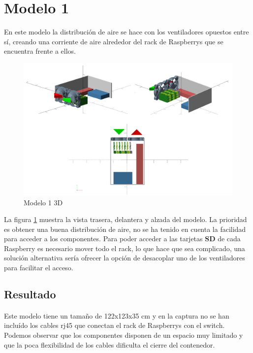 \section{Modelo 1} 
\label{makereference4.3}
\paragraph{}

En este modelo la distribución de aire se hace con los ventiladores opuestos entre sí, creando una corriente de aire alrededor del rack de Raspberrys que se encuentra frente a ellos. 
 
\begin{figure}[H]
	\centering
  	\includegraphics[width=120mm]{Modelos/M1X.png}
   	\caption[Modelo 1 3D]{Modelo 1 3D}
   \label{figure4.1}
\end{figure}

La figura \ref{figure4.1} muestra la vista trasera, delantera y alzada del modelo. La prioridad es obtener una buena distribución de aire, no se ha tenido en cuenta la facilidad para acceder a los componentes.
Para poder acceder a las tarjetas \textbf{SD} de cada Raspberry es necesario mover todo el rack, lo que hace que sea complicado, una solución alternativa sería ofrecer la opción de desacoplar uno de los ventiladores para facilitar el acceso.

\subsection{Resultado}
\paragraph{}

Este modelo tiene un tamaño de 122x123x35 cm y en la captura no se han incluído los cables rj45 que conectan el rack de Raspberrys con el switch.
Podemos observar que los componentes disponen de un espacio muy limitado y que la poca flexibilidad de los cables dificulta el cierre del contenedor.

